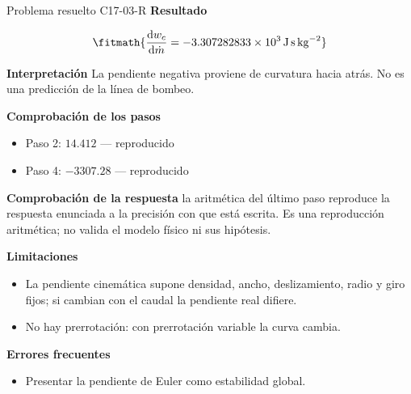 \documentclass[10pt,openany]{book}
\begin{document}
\begin{studiumworked}{Problema resuelto C17-03-R}
\noindent\textbf{Resultado}

\[
\fitmath{\frac{\mathrm{d}w_c}{\mathrm{d}\dot{m}}=-3.307282833\times10^{3}\,\mathrm{J}\,\mathrm{s}\,\mathrm{kg}^{-2}}
\]

\noindent\textbf{Interpretación}
La pendiente negativa proviene de curvatura hacia atrás. No es una predicción de la línea de bombeo.

\noindent\textbf{Comprobación de los pasos}
\begin{itemize}
\item Paso 2: $14.412$ — reproducido
\item Paso 4: $-3307.28$ — reproducido
\end{itemize}

\noindent\textbf{Comprobación de la respuesta} la aritmética del último paso reproduce la respuesta enunciada a la precisión con que está escrita. Es una reproducción aritmética; no valida el modelo físico ni sus hipótesis.

\noindent\textbf{Limitaciones}
\begin{itemize}
\item La pendiente cinemática supone densidad, ancho, deslizamiento, radio y giro fijos; si cambian con el caudal la pendiente real difiere.
\item No hay prerrotación: con prerrotación variable la curva cambia.
\end{itemize}

\noindent\textbf{Errores frecuentes}
\begin{itemize}
\item Presentar la pendiente de Euler como estabilidad global.
\end{itemize}
\end{studiumworked}
\end{document}
